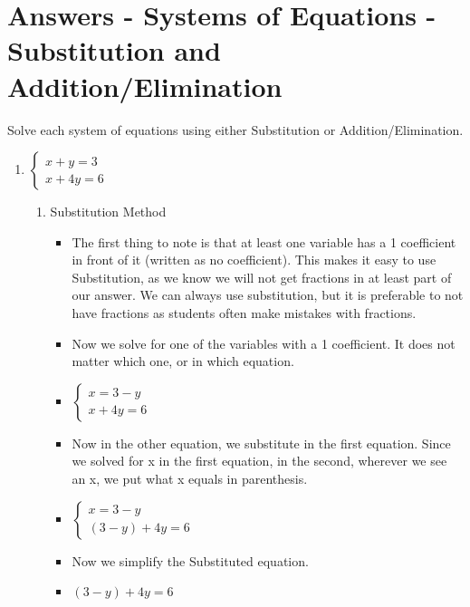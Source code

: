 \section{Answers - Systems of Equations - Substitution and Addition/Elimination}
Solve each system of equations using either Substitution or Addition/Elimination.
\begin{enumerate}
\item $\left\{ \begin{array}{l}
      x+y =3 \\
      x+4y=6 \end{array} \right.$
  \begin{enumerate}
  \item Substitution Method
    \begin{itemize}
    \item The first thing to note is that at least one variable has a 1 coefficient in front of it (written as no coefficient). This makes it easy to use Substitution, as we know we will not get fractions in at least part of our answer. We can always use substitution, but it is preferable to not have fractions as students often make mistakes with fractions.
    \item Now we solve for one of the variables with a 1 coefficient. It does not matter which one, or in which equation.
    \item [] $\left\{ \begin{array}{l}
             x=3-y \\
             x+4y=6 \end{array} \right.$
    \item Now in the other equation, we substitute in the first equation. Since we solved for x in the first equation, in the second, wherever we see an x, we put what x equals in parenthesis.
    \item [] $\left\{ \begin{array}{l}
             x=3-y \\
             (3-y)+4y=6 \end{array} \right.$
    \item Now we simplify the Substituted equation.
    \item [] $(3-y)+4y=6$

\end{itemize}
\end{enumerate}
\end{enumerate}
